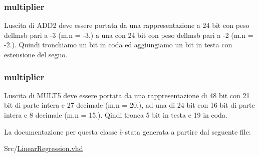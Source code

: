 \subsubsection[{\texorpdfstring{mult5}{mult5}}]{ {\bfseries \textcolor{vhdlchar}{multiplier}\textcolor{vhdlchar}{ }} \hspace{0.3cm}{\ttfamily [Instantiation]}}\hypertarget{class_linear_regression_1_1_structural_aed551c15ed15fe4ab7d0c073a7e33b9c}{}\label{class_linear_regression_1_1_structural_aed551c15ed15fe4ab7d0c073a7e33b9c}
L\textquotesingle{}uscita di A\+D\+D2 deve essere portata da una rappresentazione a 24 bit con peso dell\textquotesingle{}msb pari a -\/3 (m.\+n = -\/3.) a una con 24 bit con peso dell\textquotesingle{}msb pari a -\/2 (m.\+n = -\/2.). Quindi tronchiamo un bit in coda ed aggiungiamo un bit in testa con estensione del segno. 
\subsubsection[{\texorpdfstring{mult6}{mult6}}]{ {\bfseries \textcolor{vhdlchar}{multiplier}\textcolor{vhdlchar}{ }} \hspace{0.3cm}{\ttfamily [Instantiation]}}\hypertarget{class_linear_regression_1_1_structural_afa25d32bbc0881baaa179e393e1964c5}{}\label{class_linear_regression_1_1_structural_afa25d32bbc0881baaa179e393e1964c5}
L\textquotesingle{}uscita di M\+U\+L\+T5 deve essere portata da una rappresentazione di 48 bit con 21 bit di parte intera e 27 decimale (m.\+n = 20.), ad una di 24 bit con 16 bit di parte intera e 8 decimale (m.\+n = 15.). Qindi tronca 5 bit in testa e 19 in coda. 

La documentazione per questa classe è stata generata a partire dal seguente file\+:\begin{DoxyCompactItemize}
\item 
Src/\hyperlink{_linear_regression_8vhd}{Linear\+Regression.\+vhd}\end{DoxyCompactItemize}
